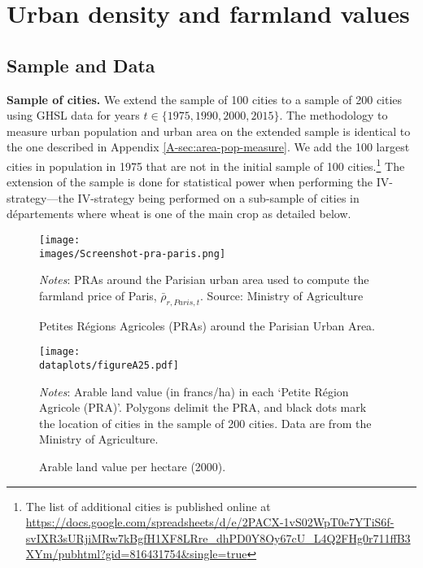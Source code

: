 \documentclass[11pt]{report}
\newcommand{\images}{../data/images}
\newcommand{\dataplots}{../output/data/plots}
\begin{document}
\pagebreak

\section{Urban density and farmland values}\label{A-sec:density-PRAdata}

\subsection{Sample and Data}

\noindent \textbf{Sample of cities.} We extend the sample of 100 cities to a sample of 200 cities using GHSL data for years $t \in \{1975, 1990, 2000, 2015\}$. The methodology to measure urban population and urban area on the extended sample is identical to the one described in Appendix \ref{A-sec:area-pop-measure}. We add the 100 largest cities in population in 1975 that are not in the initial sample of 100 cities.\footnote{The list of additional cities is published online at \url{https://docs.google.com/spreadsheets/d/e/2PACX-1vS02WpT0e7YTiS6f-svIXR3sURjiMRw7kBgfH1XF8LRre_dhPD0Y8Oy67cU_L4Q2FHg0r711ffB3XYm/pubhtml?gid=816431754&single=true}} The extension of the sample is done for statistical power when performing the IV-strategy---the IV-strategy being performed on a sub-sample of cities in départements where wheat is one of the main crop as detailed below. 


\begin{figure}[h!]
	\begin{center}
		\texttt{[image: \\images/Screenshot-pra-paris.png]}
		
	\end{center}
	\caption{Petites Régions Agricoles (PRAs) around the Parisian Urban Area.}
	\label{A-fig:PRA_Paris}
	{\footnotesize \textit{Notes}: PRAs around the Parisian urban area used to compute the farmland price of Paris, $\bar{\rho}_{r,Paris,t}$. Source: Ministry of Agriculture}
\end{figure}

\begin{figure}[h!]
	\begin{center}
		\texttt{[image: \\dataplots/figureA25.pdf]}
	\end{center}
	\caption{Arable land value per hectare (2000).}
	\label{A-fig:arablevalue}
	{\footnotesize \textit{Notes}: Arable land value (in francs/ha) in each `Petite Région Agricole (PRA)'. Polygons delimit the PRA, and black dots mark the location of cities in the sample of 200 cities. Data are from the Ministry of Agriculture.}
\end{figure}
\end{document}
